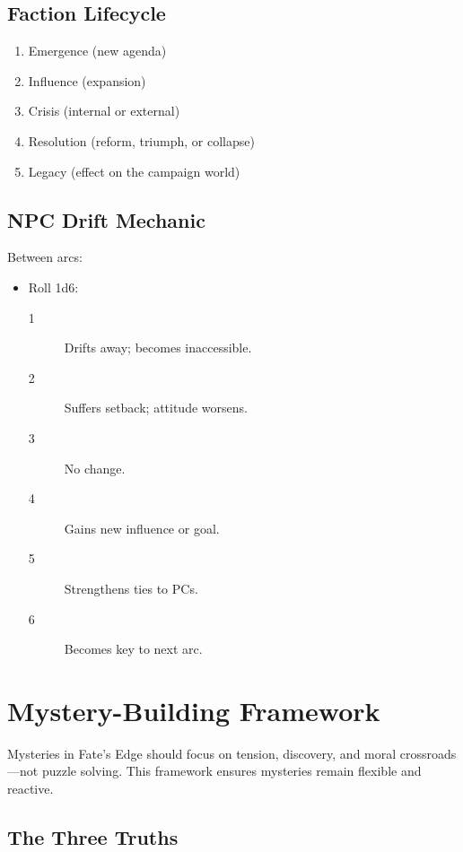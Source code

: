 \documentclass[11pt]{article}
\begin{document}
\subsection{Faction Lifecycle}

\begin{enumerate}
    \item Emergence (new agenda)
    \item Influence (expansion)
    \item Crisis (internal or external)
    \item Resolution (reform, triumph, or collapse)
    \item Legacy (effect on the campaign world)
\end{enumerate}

\subsection{NPC Drift Mechanic}

Between arcs:
\begin{itemize}
    \item Roll 1d6:
    \begin{description}
        \item[1] Drifts away; becomes inaccessible.
        \item[2] Suffers setback; attitude worsens.
        \item[3] No change.
        \item[4] Gains new influence or goal.
        \item[5] Strengthens ties to PCs.
        \item[6] Becomes key to next arc.
    \end{description}
\end{itemize}


\section{Mystery-Building Framework}
\label{appendix:mystery}

Mysteries in Fate's Edge should focus on tension, discovery, and moral crossroads---not puzzle 
solving. This framework ensures mysteries remain flexible and reactive.

\subsection{The Three Truths}
\end{document}
